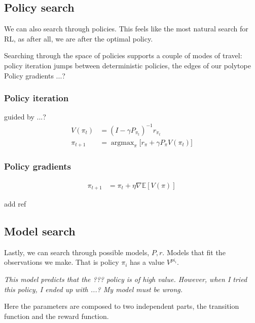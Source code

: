\subsection{Policy search}

We can also search through policies. This feels like the most natural search for RL,
as after all, we are after the optimal policy.

Searching through the space of policies supports a couple of modes of travel:
policy iteration jumps between deterministic policies, the edges of our polytope
Policy gradients ...?

\subsubsection{Policy iteration}

guided by ...?
\begin{align}
V(\pi_t) &=  (I - \gamma P_{\pi_t})^{-1} r_{\pi_t} \\
\pi_{t+1} &= \mathop{\text{argmax}}_\pi \big[r_{\pi} + \gamma P_{\pi}V(\pi_t) \big]
\end{align}


\subsubsection{Policy gradients}

\begin{align}
\pi_{t+1} &= \pi_t + \eta \nabla \mathbb E [V(\pi)]
\end{align}

add ref


\subsection{Model search}

Lastly, we can search through possible models, $P, r$. Models that fit the
observations we make. That is policy $\pi_i$ has a value $V^{pi_i}$.

\begin{displayquote}
  \textit{This model predicts that the ??? policy is of high value.
  However, when I tried this policy, I ended up with ...?
  My model must be wrong.}
\end{displayquote}

Here the parameters are composed to two independent parts, the transition function
and the reward function.

